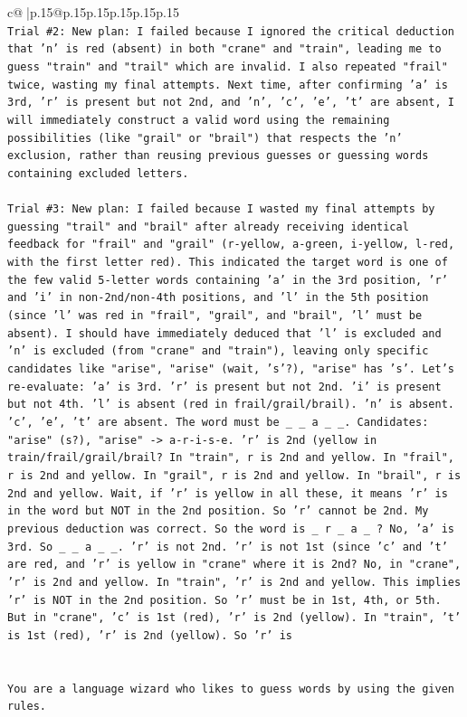 \documentclass{article}
\begin{document}
{\begin{supertabular}{c@{$\;$}|p{.15\linewidth}@{}p{.15\linewidth}p{.15\linewidth}p{.15\linewidth}p{.15\linewidth}p{.15\linewidth}}
{{{\\ 
\texttt{Trial \#2: New plan: I failed because I ignored the critical deduction that 'n' is red (absent) in both "crane" and "train", leading me to guess "train" and "trail" which are invalid. I also repeated "frail" twice, wasting my final attempts. Next time, after confirming 'a' is 3rd, 'r' is present but not 2nd, and 'n', 'c', 'e', 't' are absent, I will immediately construct a valid word using the remaining possibilities (like "grail" or "brail") that respects the 'n' exclusion, rather than reusing previous guesses or guessing words containing excluded letters.} \\
\\ 
\texttt{Trial \#3: New plan: I failed because I wasted my final attempts by guessing "trail" and "brail" after already receiving identical feedback for "frail" and "grail" (r{-}yellow, a{-}green, i{-}yellow, l{-}red, with the first letter red). This indicated the target word is one of the few valid 5{-}letter words containing 'a' in the 3rd position, 'r' and 'i' in non{-}2nd/non{-}4th positions, and 'l' in the 5th position (since 'l' was red in "frail", "grail", and "brail", 'l' must be absent). I should have immediately deduced that 'l' is excluded and 'n' is excluded (from "crane" and "train"), leaving only specific candidates like "arise", "arise" (wait, 's'?), "arise" has 's'. Let's re{-}evaluate: 'a' is 3rd. 'r' is present but not 2nd. 'i' is present but not 4th. 'l' is absent (red in frail/grail/brail). 'n' is absent. 'c', 'e', 't' are absent. The word must be \_ \_ a \_ \_. Candidates: "arise" (s?), "arise" {-}> a{-}r{-}i{-}s{-}e. 'r' is 2nd (yellow in train/frail/grail/brail? In "train", r is 2nd and yellow. In "frail", r is 2nd and yellow. In "grail", r is 2nd and yellow. In "brail", r is 2nd and yellow. Wait, if 'r' is yellow in all these, it means 'r' is in the word but NOT in the 2nd position. So 'r' cannot be 2nd. My previous deduction was correct. So the word is \_ r \_ a \_ ? No, 'a' is 3rd. So \_ \_ a \_ \_. 'r' is not 2nd. 'r' is not 1st (since 'c' and 't' are red, and 'r' is yellow in "crane" where it is 2nd? No, in "crane", 'r' is 2nd and yellow. In "train", 'r' is 2nd and yellow. This implies 'r' is NOT in the 2nd position. So 'r' must be in 1st, 4th, or 5th. But in "crane", 'c' is 1st (red), 'r' is 2nd (yellow). In "train", 't' is 1st (red), 'r' is 2nd (yellow). So 'r' is} \\
\\ 
\\ 
\texttt{You are a language wizard who likes to guess words by using the given rules.} \\
}}}
\end{supertabular}}
\end{document}
